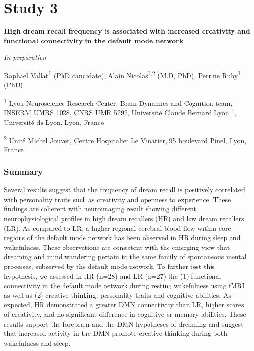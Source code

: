 \cleardoublepage

\chapter{Study 3}
\label{res:dmn-crea}

\textbf{{\large High dream recall frequency is associated with increased creativity and functional connectivity in the default mode network}}

\hfill \emph{In preparation}

\bigskip

Raphael Vallat\textsuperscript{1} (PhD candidate), Alain Nicolas\textsuperscript{1,2} (M.D, PhD), Perrine Ruby\textsuperscript{1} (PhD)

\textsuperscript{1} Lyon Neuroscience Research Center, Brain Dynamics and Cognition team, INSERM UMRS 1028, CNRS UMR 5292, Université Claude Bernard Lyon 1, Université de Lyon, Lyon, France

\textsuperscript{2} Unité Michel Jouvet, Centre Hospitalier Le Vinatier, 95 boulevard Pinel, Lyon, France

\subsection*{Summary}
\label{res:dmn-crea:summary}
Several results suggest that the frequency of dream recall is positively correlated with personality traits such as creativity and openness to experience. These findings are coherent with neuroimaging result showing different neurophysiological profiles in high dream recallers (HR) and low dream recallers (LR).  As compared to LR, a higher regional cerebral blood flow within core regions of the default mode network has been observed in HR during sleep and wakefulness. These observations are consistent with the emerging view that dreaming and mind wandering pertain to the same family of spontaneous mental processes, subserved by the default mode network. To further test this hypothesis, we assessed in HR (n=28) and LR (n=27) the (1) functional connectivity in the default mode network during resting wakefulness using fMRI as well as (2) creative-thinking, personality traits and cognitive abilities. As expected, HR demonstrated a greater DMN connectivity than LR, higher scores of creativity, and no significant difference in cognitive or memory abilities. These results support the forebrain and the DMN hypotheses of dreaming and suggest that increased activity in the DMN promote creative-thinking during both wakefulness and sleep.

